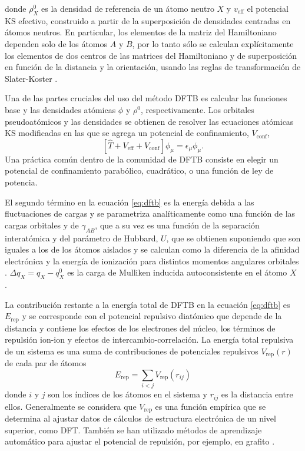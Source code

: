 donde $\rho_X^0$ es la densidad de referencia de un átomo neutro $X$ y 
$v_{\text{eff}}$ el potencial KS efectivo, construido a partir de la superposición
de densidades centradas en átomos neutros. En particular, los elementos de la 
matriz del Hamiltoniano dependen solo de los átomos $A$ y $B$, por lo tanto sólo
se calculan explícitamente los elementos de dos centros de las matrices del 
Hamiltoniano y de superposición en función de la distancia y la orientación, usando 
las reglas de transformación de Slater-Koster \cite{slater1954}.

Una de las partes cruciales del uso del método DFTB es calcular las funciones 
base y las densidades atómicas $\phi$ y $\rho^0$, respectivamente. Los orbitales
pseudoatómicos y las densidades se obtienen de resolver las ecuaciones atómicas KS 
modificadas en las que se agrega un potencial de confinamiento, $V_{\text{conf}}$,
\begin{equation}\label{eq:dft}
    \left[\hat{T}+V_{\text{eff}}+V_{\text{conf}}\right]\phi_\mu=\epsilon_\mu\phi_\mu.
\end{equation}
Una práctica común dentro de la comunidad de DFTB consiste en elegir un potencial
de confinamiento parabólico, cuadrático, o una función de ley de potencia.

El segundo término en la ecuación \ref{eq:dftb} es la energía debida a las 
fluctuaciones de cargas y se parametriza analíticamente como una función de las
cargas orbitales y de $\gamma_{AB}$, que a su vez es una función de la separación 
interatómica y del parámetro de Hubbard, $U$, que se obtienen suponiendo que son 
iguales a los de los átomos aislados y se calculan como la diferencia de la 
afinidad electrónica y la energía de ionización para distintos momentos angulares 
orbitales \cite{elstner1998b}. $\Delta q_X = q_X - q_X^0$ es la carga de Mulliken 
inducida autoconsistente en el átomo $X$ \cite{elstner1998}.

La contribución restante a la energía total de DFTB en la ecuación \ref{eq:dftb}
es $E_{\text{rep}}$ y se corresponde con el potencial repulsivo diatómico que 
depende de la distancia y contiene los efectos de los electrones del núcleo, los 
términos de repulsión ion-ion y efectos de intercambio-correlación. 
La energía total repulsiva de un sistema es una suma de contribuciones de 
potenciales repulsivos $V_{\text{rep}}(r)$ de cada par de átomos
\begin{equation}\label{eq:rep}
    E_{\text{rep}}=\sum_{i<j} V_{\text{rep}}(r_{ij})
\end{equation}
donde $i$ y $j$ son los índices de los átomos en el sistema y $r_{ij}$ es la 
distancia entre ellos. Generalmente se considera que $V_{\text{rep}}$ es una
función empírica que se determina al ajustar datos de cálculos de estructura 
electrónica de un nivel superior, como DFT. También se han utilizado métodos de 
aprendizaje automático para ajustar el potencial de repulsión, por ejemplo, en 
grafito \cite{panosetti2021, annies2021}.
